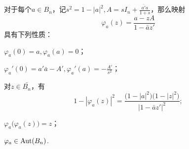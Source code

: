 \begin{theorem}\label{thm9.6.2}
  对于每个$a\in B_n$，记$s^2=1-|a|^2,A=sI_n+\frac{\bar {a'}a}{1+s}$，那么映射
  \[
    \varphi_a(z) = \frac{a-zA}{1-\bar az'}
  \]
  具有下列性质：
  \begin{eenum}
    \item \label{thm9.6.2.1} $\varphi_a(0)=a,\varphi_a(a)=0$；
    \item \label{thm9.6.2.2} $\varphi_a'(0)=a'\bar a-A',\varphi_a'(a)=-\frac{A'}{s^2}$；
    \item \label{thm9.6.2.3} 对$z\in\bar{B_n}$，有
        \[
          1-|\varphi_a(z)|^2 = \frac{\big(1-|a|^2\big)\big(1-|z|^2\big)}{|1-\bar az'|^2};
        \]
    \item \label{thm9.6.2.4} $\varphi_a\big(\varphi_a(z)\big)=z$；
    \item \label{thm9.6.2.5} $\varphi_a\in\operatorname{Aut}(B_n)$.
  \end{eenum}
\end{theorem}
